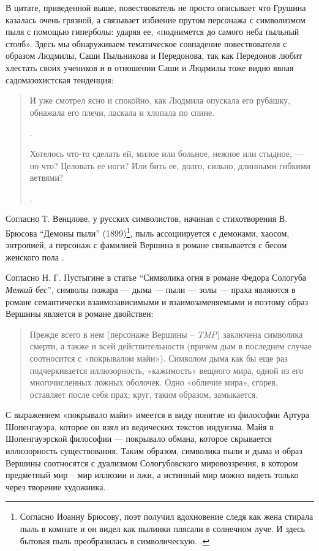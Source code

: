 \documentclass[12pt,a4paper]{article}
\begin{document}
В цитате, приведенной выше, повествователь не просто описывает что Грушина казалась очень грязной, а  связывает избиение прутом персонажа с символизмом пыля с помощью гиперболы: ударяя ее, «поднимется до самого неба пыльный столб». Здесь мы обнаруживаем тематическое совпадение повествователя с образом Людмилы, Саши Пыльникова и Передонова, так как Передонов любит хлестать своих учеников и в отношении Саши и Людмилы тоже видно явная садомазохистская тенденция:
\begin{quote}
И уже смотрел ясно и спокойно, как Людмила опускала его рубашку, обнажала его плечи, ласкала и хлопала по спине.

\parencite[208]{sologub2004}.

Хотелось что-то сделать ей, милое или больное, нежное или
стыдное, — но что? Целовать ее ноги? Или бить ее, долго, сильно, длинными гибкими ветвями?

\parencite[211]{sologub2004}.
\end{quote}

Согласно Т. Венцлове, у русских символистов, начиная с стихотворения В. Брюсова \enquote{Демоны пыли} (1899)\footnote{ Согласно Иоанну Брюсову, поэт получил вдохновение следя как жена стирала пыль в комнате и он видел как пылинки плясали в солнечном луче. И здесь бытовая пыль преобразилась в символическую. \parencite[600]{brjusov1973}.}, пыль ассоциируется с демонами, хаосом, энтропией, а персонаж с фамилией Вершина в романе связывается с бесом женского пола \parencite[42--44]{venclova2012}.

Согласно Н. Г. Пустыгине в статье \enquote{Символика огня в романе Федора Сологуба \emph{Мелкий бес}}, символы пожара — дыма — пыли — золы — праха являются в романе семантически взаимозависимыми и взаимозаменяемыми и поэтому образ Вершины является в романе двойствен:

\begin{quote}
Прежде всего в нем (персонаже Вершины – \textit{TMP}) заключена символика смерти, а также и всей действительности (причем дым в последнем случае соотносится с «покрывалом майи»). Символом дыма как бы еще раз подчеркивается иллюзорность, «кажимость» вещного мира, одной из его многочисленных ложных оболочек. Одно «обличие мира», сгорев, оставляет после себя прах; круг, таким образом, замыкается.

\parencite[134.]{pustygina1989}

\end{quote}

С выражением «покрывало майи» имеется в виду понятие из философии Артура Шопенгауэра, которое он взял из ведических текстов индуизма. Майя в Шопенгауэрской философии — покрывало обмана, которое скрывается иллюзорность существования. Таким образом, символика пыли и дыма и образ Вершины соотносятся с дуализмом Сологубовского мировоззрения, в котором  предметный мир – мир иллюзии и лжи, а истинный мир можно видеть только через творение художника.
\end{document}
